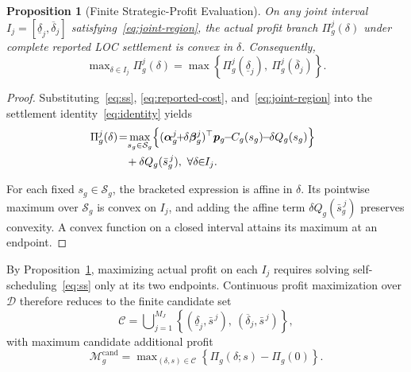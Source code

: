 \documentclass[journal]{IEEEtran}
\newtheorem{proposition}{Proposition}
\newcommand{\bp}{\bm p}
\begin{document}
\begin{proposition}[Finite Strategic-Profit Evaluation]
\label{prop:finite}
On any joint interval $I_j=[\underline{\delta}_j,\overline{\delta}_j]$ satisfying~\eqref{eq:joint-region}, the actual profit branch $\Pi_g^j(\delta)$ under complete reported LOC settlement is convex in $\delta$. Consequently,
\begin{equation}
\max\nolimits_{\delta\in I_j} \Pi_g^j(\delta)
= \max\left\{ \Pi_g^j(\underline{\delta}_j),\ \Pi_g^j(\overline{\delta}_j) \right\}.\label{eq:endpoint}
\end{equation}
\end{proposition}

\begin{proof}
Substituting~\eqref{eq:ss}, \eqref{eq:reported-cost}, and~\eqref{eq:joint-region} into the settlement identity~\eqref{eq:identity} yields
\begin{equation}
\begin{aligned}
\!\!\!\!\Pi_g^j(\delta) \!=\! &\max_{s_g\in\mathcal{S}_g}\Bigl\{
(\bm{\alpha}_g^j \!\!+\!\! \delta\bm{\beta}_g^j)^\top\bp_g \!\!-\!\! C_g(s_g) \!\!-\!\! \delta Q_g(s_g)
\Bigr\}\\
&+ \delta Q_g(\bar{s}_g^{\,j}), \ \forall\delta\!\!\in\!\! I_j.
\end{aligned}\label{eq:convex-profit}
\end{equation}

For each fixed $s_g\!\!\in\!\!\mathcal{S}_g$, the bracketed expression is affine in $\delta$. Its pointwise maximum over $\mathcal{S}_g$ is convex on $I_j$, and adding the affine term $\delta Q_g(\bar{s}_g^{\,j})$ preserves convexity. A convex function on a closed interval attains its maximum at an endpoint.
\end{proof}

By Proposition~\ref{prop:finite}, maximizing actual profit on each $I_j$ requires solving self-scheduling~\eqref{eq:ss} only at its two endpoints. Continuous profit maximization over $\mathcal{D}$ therefore reduces to the finite candidate set
\begin{equation}
\mathcal{C} = \bigcup\nolimits_{j=1}^{M_J}
\left\{ (\underline{\delta}_j,\bar{s}^{\,j}),\ (\overline{\delta}_j,\bar{s}^{\,j}) \right\},\label{eq:candidate-set}
\end{equation}
with maximum candidate additional profit
\begin{equation}
\mathcal{M}_g^{\mathrm{cand}} = \max\nolimits_{(\delta,s)\in\mathcal{C}}
\left\{ \Pi_g(\delta;s) - \Pi_g(0) \right\}.\label{eq:candidate-value}
\end{equation}
\end{document}
